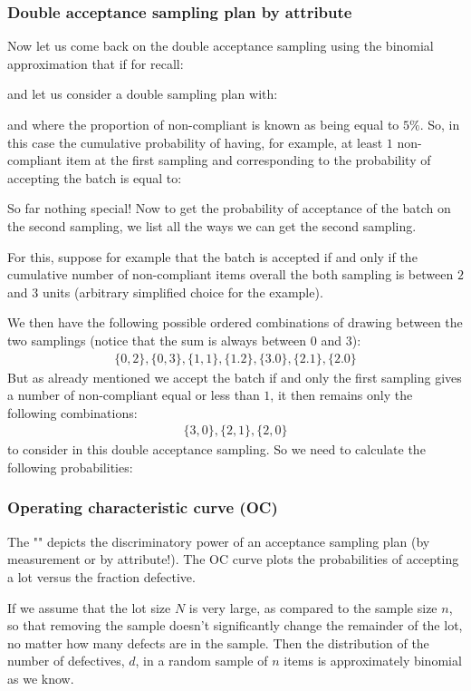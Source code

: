 	\subsubsection{Double acceptance sampling plan by attribute}
	Now let us come back on the double acceptance sampling using the binomial approximation that if for recall:
	
	and let us consider a double sampling plan with:
	
	and where the proportion of non-compliant is known as being equal to $5\%$. So, in this case the cumulative probability of having, for example, at least $1$ non-compliant item at the first sampling and corresponding to the probability of accepting the batch is equal to:
	
	So far nothing special! Now to get the probability of acceptance of the batch on the second sampling, we list all the ways we can get the second sampling. 

	For this, suppose for example that the batch is accepted if and only if the cumulative number of non-compliant items overall the both sampling is between $2$ and $3$ units (arbitrary simplified choice for the example).
	
	We then have the following possible ordered combinations of drawing between the two samplings (notice that the sum is always between $0$ and $3$):
	\begin{gather*}
		 \{0,2\}, \{0,3\}, \{1,1\}, \{1.2\}, \{3.0\}, \{2.1\}, \{ 2.0\}
	\end{gather*}
	 But as already mentioned we accept the batch if and only the first sampling gives a number of non-compliant equal or less than $1$, it then remains only the following combinations:
	\begin{gather*}
		 \{3,0\}, \{2,1\}, \{2,0\}
	\end{gather*}
	to consider in this double acceptance sampling. So we need to calculate the following probabilities:
	
	
	\subsubsection{Operating characteristic curve (OC)}
	The ""  depicts the discriminatory power of an acceptance sampling plan (by measurement or by attribute!). The OC curve plots the probabilities of accepting a lot versus the fraction defective.

	If we assume that the lot size $N$ is very large, as compared to the sample size $n$, so that removing the sample doesn't significantly change the remainder of the lot, no matter how many defects are in the sample. Then the distribution of the number of defectives, $d$, in a random sample of $n$ items is approximately binomial as we know.

